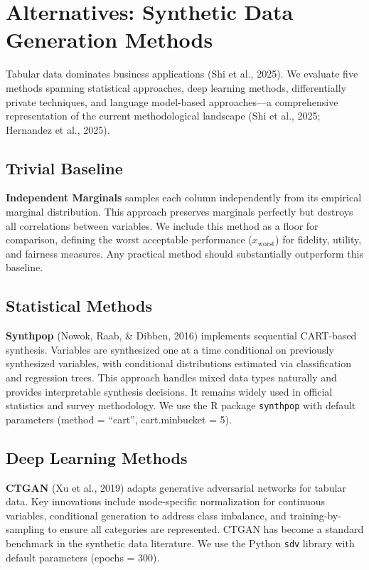 \documentclass[12pt,a4paper]{article}
\begin{document}
\section{Alternatives: Synthetic Data Generation Methods}

Tabular data dominates business applications (Shi et al., 2025). We evaluate five methods spanning statistical approaches, deep learning methods, differentially private techniques, and language model-based approaches---a comprehensive representation of the current methodological landscape (Shi et al., 2025; Hernandez et al., 2025).

\subsection{Trivial Baseline}

\textbf{Independent Marginals} samples each column independently from its empirical marginal distribution. This approach preserves marginals perfectly but destroys all correlations between variables. We include this method as a floor for comparison, defining the worst acceptable performance ($x_{\text{worst}}$) for fidelity, utility, and fairness measures. Any practical method should substantially outperform this baseline.

\subsection{Statistical Methods}

\textbf{Synthpop} (Nowok, Raab, \& Dibben, 2016) implements sequential CART-based synthesis. Variables are synthesized one at a time conditional on previously synthesized variables, with conditional distributions estimated via classification and regression trees. This approach handles mixed data types naturally and provides interpretable synthesis decisions. It remains widely used in official statistics and survey methodology. We use the R package \texttt{synthpop} with default parameters (method = ``cart'', cart.minbucket = 5).

\subsection{Deep Learning Methods}

\textbf{CTGAN} (Xu et al., 2019) adapts generative adversarial networks for tabular data. Key innovations include mode-specific normalization for continuous variables, conditional generation to address class imbalance, and training-by-sampling to ensure all categories are represented. CTGAN has become a standard benchmark in the synthetic data literature. We use the Python \texttt{sdv} library with default parameters (epochs = 300).
\end{document}
